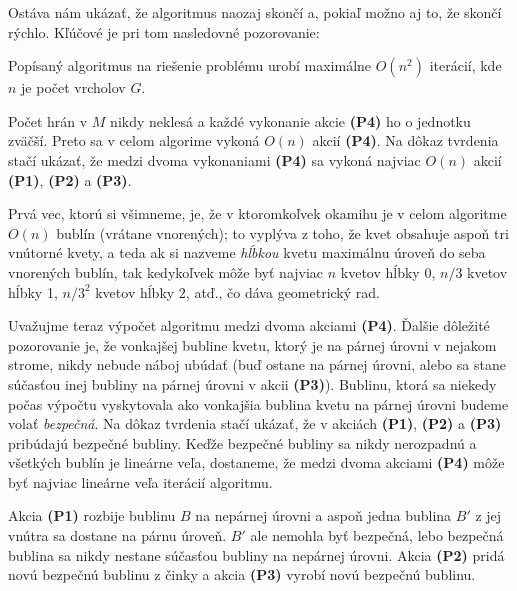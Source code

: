\noindent
Ostáva nám ukázať, že algoritmus naozaj skončí a, pokiaľ možno aj to, že skončí rýchlo. Kľúčové je pri tom
nasledovné pozorovanie:

\begin{lema}
  Popísaný algoritmus na riešenie problému \minfactor urobí maximálne $O(n^2)$ iterácií, kde $n$ je počet vrcholov
  $G$.
\end{lema}
\begin{dokaz}
  Počet hrán v $M$ nikdy neklesá a každé vykonanie akcie {\bf (P4)} ho o jednotku zväčší. Preto sa v celom algorime
  vykoná $O(n)$ akcií  {\bf (P4)}. Na dôkaz tvrdenia stačí ukázať, že medzi dvoma vykonaniami  {\bf (P4)}
  sa vykoná najviac $O(n)$ akcií  {\bf (P1)}, {\bf (P2)} a {\bf (P3)}.

\noindent
  Prvá vec, ktorú si všimneme, je, že v ktoromkoľvek okamihu je v celom algoritme $O(n)$ bublín (vrátane vnorených);
  to vyplýva z toho, že kvet obsahuje aspoň tri vnútorné kvety, a teda ak si nazveme {\em hĺbkou } kvetu maximálnu
  úroveň do seba vnorených bublín, 
  tak kedykoľvek môže byť najviac $n$ kvetov hĺbky 0, $n/3$ kvetov hĺbky 1, $n/3^2$ kvetov
  hĺbky $2$, atď., čo dáva geometrický rad.

\noindent
 Uvažujme teraz výpočet algoritmu medzi dvoma akciami {\bf (P4)}. Ďalšie dôležité pozorovanie je, že
 vonkajšej bubline kvetu, ktorý je na párnej úrovni v nejakom strome, nikdy nebude náboj ubúdať (buď ostane na párnej
 úrovni, alebo sa stane súčasťou inej bubliny na párnej úrovni v akcii {\bf(P3)}). Bublinu, ktorá sa niekedy
 počas výpočtu vyskytovala ako vonkajšia bublina kvetu na párnej úrovni budeme volať {\em bezpečná}.
 Na dôkaz tvrdenia stačí ukázať, že v akciách {\bf (P1)}, {\bf (P2)} a {\bf (P3)} pribúdajú bezpečné bubliny.
 Keďže bezpečné bubliny sa nikdy nerozpadnú a všetkých bublín je lineárne veľa, dostaneme, že medzi dvoma
 akciami {\bf (P4)} môže byť najviac lineárne veľa iterácií algoritmu.

 \noindent
 Akcia {\bf (P1)} rozbije bublinu $B$ na nepárnej úrovni a aspoň jedna bublina $B'$ 
 z jej vnútra sa dostane na párnu úroveň.
 $B'$ ale nemohla byť bezpečná, lebo bezpečná bublina sa nikdy nestane súčasťou bubliny na nepárnej úrovni.
 Akcia {\bf (P2)} pridá novú bezpečnú bublinu z činky a akcia {\bf (P3)} vyrobí novú bezpečnú bublinu.
\end{dokaz}


